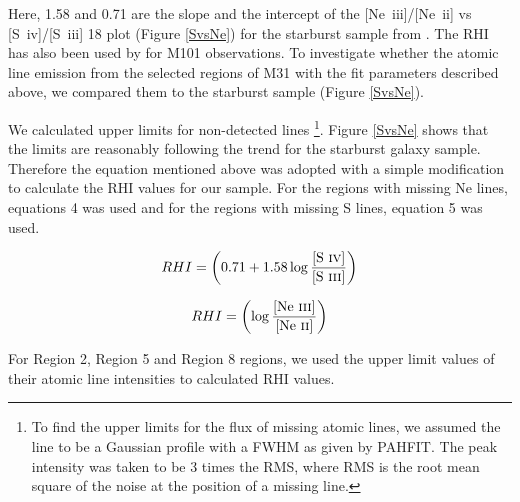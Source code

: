 	Here, 1.58 and 0.71 are the slope and the intercept of the [Ne~{\sc iii}]/[Ne~{\sc ii}]  vs [S~{\sc iv}]/[S~{\sc iii}] 18 plot (Figure \ref{SvsNe}) for the starburst sample from \citet{Engelbracht_2008}. The RHI has also been used by \citet{Gordon:2008lr} for M101 observations. To investigate whether the atomic line emission from the selected regions of M31 with the fit parameters described above, we compared them to the starburst sample (Figure \ref{SvsNe}). 
	
	We calculated upper limits for non-detected lines \footnote{To find the upper limits for the flux of missing atomic lines, we assumed the line to be a Gaussian profile with a FWHM as given by PAHFIT. The peak intensity was taken to be 3 times the RMS, where RMS is the root mean square of the noise at the position of a missing line.}. Figure \ref{SvsNe}  shows that the limits are reasonably following the trend for the starburst galaxy sample. Therefore the equation mentioned above was adopted with a simple modification to calculate the RHI values for our sample. For the regions with missing Ne lines, equations 4 was used and for the regions with missing S lines, equation 5 was used. 




\vspace{2 mm}	
\begin{equation}
RHI = \left(0.71 + 1.58\log\frac{\textrm{[S~{\sc iv}]}}{\textrm{[S~{\sc iii}]}}\right)
\vspace{1 mm}	
\end{equation}

\vspace{1 mm}	
\begin{equation}
RHI = \left(\log\frac{\textrm{[Ne~{\sc iii}]}}{\textrm{[Ne~{\sc ii}]}}\right)
\vspace{5 mm}	
\end{equation}
		
		For Region 2, Region 5 and Region 8 regions, we used the upper limit values of their atomic line intensities to calculated RHI values.
	

